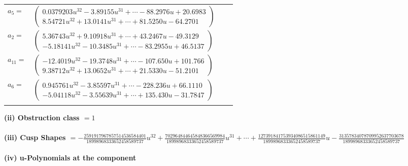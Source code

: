 \documentclass[1p]{elsarticle_modified}
\theoremstyle{definition}
\begin{document}
\begin{tabular}{m{7pt} m{180pt} m{7pt} m{180pt} }
\flushright $a_{5}=$&$\begin{pmatrix}0.0379203 u^{32}-3.89155 u^{31}+\cdots-88.2976 u+20.6983\\8.54721 u^{32}+13.0141 u^{31}+\cdots+81.5250 u-64.2701\end{pmatrix}$ \\
\flushright $a_{2}=$&$\begin{pmatrix}5.36743 u^{32}+9.10918 u^{31}+\cdots+43.2467 u-49.3129\\-5.18141 u^{32}-10.3485 u^{31}+\cdots-83.2955 u+46.5137\end{pmatrix}$ \\
\flushright $a_{11}=$&$\begin{pmatrix}-12.4019 u^{32}-19.3748 u^{31}+\cdots-107.650 u+101.766\\9.38712 u^{32}+13.0652 u^{31}+\cdots+21.5330 u-51.2101\end{pmatrix}$ \\
\flushright $a_{6}=$&$\begin{pmatrix}0.945761 u^{32}-3.85597 u^{31}+\cdots-228.236 u+66.1110\\-5.04118 u^{32}-3.55639 u^{31}+\cdots+135.430 u-31.7847\end{pmatrix}$\\&\end{tabular}
\flushleft \textbf{(ii) Obstruction class $= 1$}\\~\\
\flushleft \textbf{(iii) Cusp Shapes $= -\frac{2591917967857514536584401}{18998968333652458589737} u^{32}+\frac{702964844645848366569984}{18998968333652458589737} u^{31}+\cdots+\frac{127391841753934086515861149}{18998968333652458589737} u-\frac{31357834078709952637703678}{18998968333652458589737}$}\\~\\
\newpage\renewcommand{\arraystretch}{1}
\flushleft \textbf{(iv) u-Polynomials at the component}\newline \\
\end{document}
